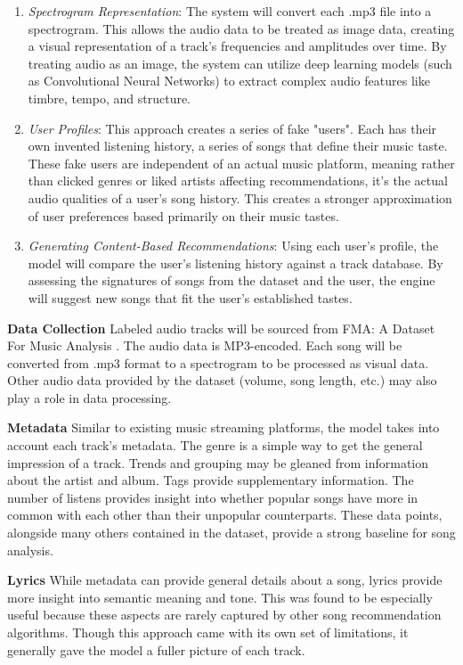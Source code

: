 \begin{enumerate}
	\item \textit{Spectrogram Representation}: The system will convert each .mp3 file into a spectrogram. This allows the audio data to be treated as image data, creating a visual representation of a track's frequencies and amplitudes over time. By treating audio as an image, the system can utilize deep learning models (such as Convolutional Neural Networks) to extract complex audio features like timbre, tempo, and structure.

	\item \textit{User Profiles}: This approach creates a series of fake "users". Each has their own invented listening history, a series of songs that define their music taste. These fake users are independent of an actual music platform, meaning rather than clicked genres or liked artists affecting recommendations, it's the actual audio qualities of a user's song history. This creates a stronger approximation of user preferences based primarily on their music tastes.

	\item \textit{Generating Content-Based Recommendations}: Using each user's profile, the model will compare the user's listening history against a track database. By assessing the signatures of songs from the dataset and the user, the engine will suggest new songs that fit the user's established tastes.
\end{enumerate}

\textbf{Data Collection}
Labeled audio tracks will be sourced from FMA: A Dataset For Music Analysis \cite{FMA}. The audio data is MP3-encoded. Each song will be converted from .mp3 format to a spectrogram to be processed as visual data. Other audio data provided by the dataset (volume, song length, etc.) may also play a role in data processing.

\textbf{Metadata}
Similar to existing music streaming platforms, the model takes into account each track’s metadata. The genre is a simple way to get the general impression of a track. Trends and grouping may be gleaned from information about the artist and album. Tags provide supplementary information. The number of listens provides insight into whether popular songs have more in common with each other than their unpopular counterparts. These data points, alongside many others contained in the dataset, provide a strong baseline for song analysis.

\textbf{Lyrics}
While metadata can provide general details about a song, lyrics provide more insight into semantic meaning and tone. This was found to be especially useful because these aspects are rarely captured by other song recommendation algorithms. Though this approach came with its own set of limitations, it generally gave the model a fuller picture of each track.